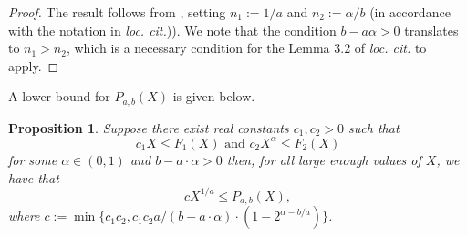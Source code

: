 \documentclass[11pt]{amsart}
\newtheorem{proposition}[theorem]{Proposition}
\numberwithin{equation}{section}
\begin{document}
\begin{proof}
The result follows from \cite[Lemma 3.2]{Wang2020}, setting $n_1:=1/a$ and $n_2:=\alpha/b$ (in accordance with the notation in \emph{loc. cit.})). We note that the condition $b-a\alpha>0$ translates to $n_1>n_2$, which is a necessary condition for the Lemma 3.2 of \emph{loc. cit.} to apply. 
\end{proof}
A lower bound for $P_{a,b}(X)$ is given below.
\begin{proposition}\label{lower prod}
    Suppose there exist real constants $c_1, c_2 > 0$ such that
    \[
    c_1 X \leq F_1(X) \text{ and } c_2 X^{\alpha} \leq F_2(X)
    \]
    for some $\alpha \in (0,1)$ and $b-a\cdot\alpha > 0$ then, for all large enough values of $X$, we have that
   \begin{equation}
       c X^{1/a} \leq P_{a,b}(X),
   \end{equation}
   where $c:= \min\{c_1c_2, c_1c_2a/(b-a\cdot\alpha)\cdot(1-2^{\alpha - b/a})\}$.
\end{proposition}
\end{document}
